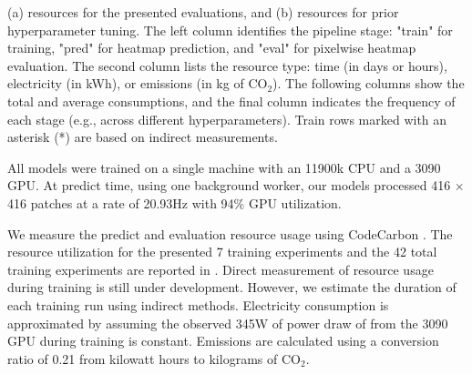 \documentclass[10pt,twocolumn,letterpaper]{article}
\newcommand{\cotwo}{\ensuremath{\mathrm{CO_2}}}
\begin{document}
\begin{table}[t]
{(a) resources for the presented evaluations, and (b) resources for prior hyperparameter tuning.
The left column identifies the pipeline stage:
"train" for training, "pred" for heatmap prediction, and "eval" for pixelwise heatmap evaluation.
The second column lists the resource type: time (in days or hours), electricity (in kWh), or emissions (in
  kg of \cotwo{}).
The following columns show the total and average consumptions, and the final column indicates the
  frequency of each stage (e.g., across different hyperparameters).
Train rows marked with an asterisk (*) are based on indirect measurements.
}
\label{tab:resources}
\end{table}

All models were trained on a single machine with an 11900k CPU and a 3090 GPU.
At predict time, using one background worker, our models processed 416 $\times$
416 patches at a rate of 20.93Hz with 94\% GPU utilization.

We measure the predict and evaluation resource usage using CodeCarbon
\cite{lacoste2019codecarbon}.
The resource utilization for the presented 7 training experiments and the 42
total training experiments are reported in
 . 
Direct measurement of resource usage during training is still under
development. However, we estimate the duration of each training run using
indirect methods. Electricity consumption is approximated by assuming the
observed 345W of power draw of from the 3090 GPU during training is constant.
Emissions are calculated using a conversion ratio of 0.21 from kilowatt hours
to kilograms of \cotwo{}.
\end{document}
